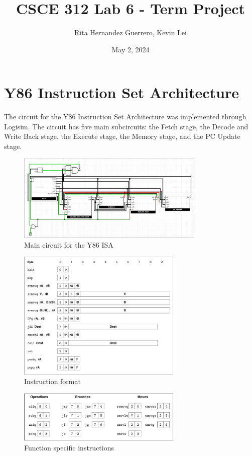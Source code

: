 \documentclass{article}
\title{CSCE 312 Lab 6 - Term Project}
\author{Rita Hernandez Guerrero, Kevin Lei}
\date{May 2, 2024}
\begin{document}
\maketitle

\section{Y86 Instruction Set Architecture}
The circuit for the Y86 Instruction Set Architecture was implemented through Logisim. 
The circuit has five main subcircuits: the Fetch stage, the Decode and Write Back stage, the Execute stage, the Memory stage, and the PC Update stage.

\begin{figure}[H]
    \centering
    \includegraphics[width=0.8\textwidth]{./images/main_circuit.png}
    \caption{Main circuit for the Y86 ISA}
\end{figure}

\begin{figure}[H]
    \centering
    \includegraphics[width=0.7\textwidth]{./images/instructions.png}
    \caption{Instruction format}
\end{figure}
\newpage
\begin{figure}[H]
    \centering
    \includegraphics[width=0.7\textwidth]{./images/sub_instructions.png}
    \caption{Function specific instructions}
\end{figure}
\end{document}
